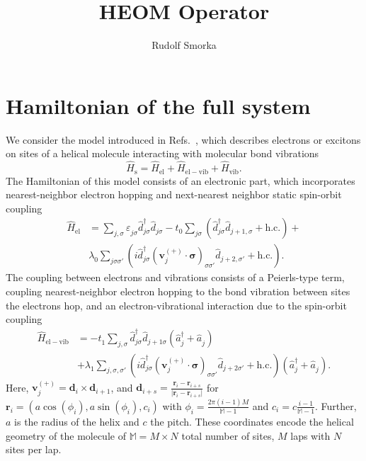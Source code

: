 \documentclass{article}
\renewcommand{\vec}[1]{\mathbf{#1}}
\newcommand{\pdagger}{{\phantom{\dagger}}}
\begin{document}
\title{HEOM Operator}
\author{Rudolf Smorka}
\maketitle
\section{Hamiltonian of the full system}
We consider the model introduced in Refs.~\cite{fransson2019chirality,fransson2020vibrational,Fransson_2021,fransson2021charge}, which describes electrons or excitons on sites of a helical molecule interacting with molecular bond vibrations
\begin{equation}
	\hat{H}_\mathrm{s} = \hat{H}_\mathrm{el} + \hat{H}_\mathrm{el-vib} + \hat{H}_\mathrm{vib}.  \label{eq:H_s}
\end{equation}
The Hamiltonian of this model consists of an electronic part, which incorporates nearest-neighbor electron hopping and next-nearest neighbor static spin-orbit coupling 
\begin{equation}
	\begin{split}
		\hat{H}_\mathrm{el} &= \sum_{j,\sigma} \varepsilon_{j\sigma}^\pdagger \hat{d}_{j\sigma}^\dagger \hat{d}_{j\sigma}^\pdagger - t_0 \sum_{j\sigma} (\hat{d}_{j\sigma}^\dagger \hat{d}_{j+1,\sigma}^\pdagger + \mathrm{h.c.}) +\\& \lambda_0^\pdagger\sum_{j\sigma\sigma'} (i\hat{d}_{j\sigma}^\dagger (\vec{v}_j^{(+)}\cdot \bm{\sigma})_{\sigma\sigma'}^\pdagger \hat{d}_{j+2,\sigma'}^\pdagger + \mathrm{h.c.}).\label{eq:H_el}
	\end{split}
\end{equation}
The coupling between electrons and vibrations consists of a Peierls-type term, coupling nearest-neighbor electron hopping to the bond vibration between sites the electrons hop, and an electron-vibrational interaction due to the spin-orbit coupling 
\begin{align}
	\hat{H}_\mathrm{el-vib} &= - t_1^\pdagger \sum_{j,\sigma}  \hat{d}_{j\sigma}^\dagger \hat{d}_{j+1\sigma}^\pdagger (\hat{a}_{j}^\dagger + \hat{a}_{j}^\pdagger) \\ & + \lambda_1^\pdagger\sum_{j,\sigma,\sigma'} (i \hat{d}_{j\sigma}^\dagger (\vec{v}_j^{(+)} \cdot \bm{\sigma})_{\sigma\sigma'}^\pdagger \hat{d}_{j+2\sigma'}^\pdagger +\mathrm{h.c.})(\hat{a}_{j}^\dagger + \hat{a}_{j}^\pdagger).\label{eq:H_el-vib}
\end{align}
Here, $\vec{v}^{(+)}_j = \vec{d}_i\times \vec{d}_{i+1}$, and $\vec{d}_{i+s} = \frac{\vec{r}_i - \vec{r}_{i+s}}{\vert \vec{r}_i - \vec{r}_{i+s}\vert}$ for $\vec{r}_i = (a\cos (\phi_i), a\sin(\phi_i),c_i)$ with $\phi_i = \frac{2\pi(i-1)M}{\mathbb{M}-1}$ and $c_i = c\frac{i-1}{\mathbb{M}-1}$. Further, $a$ is the radius of the helix and $c$ the pitch. These coordinates encode the helical geometry of the molecule of $\mathbb{M}=M\times N$ total number of sites, $M$ laps with $N$ sites per lap.
\end{document}
